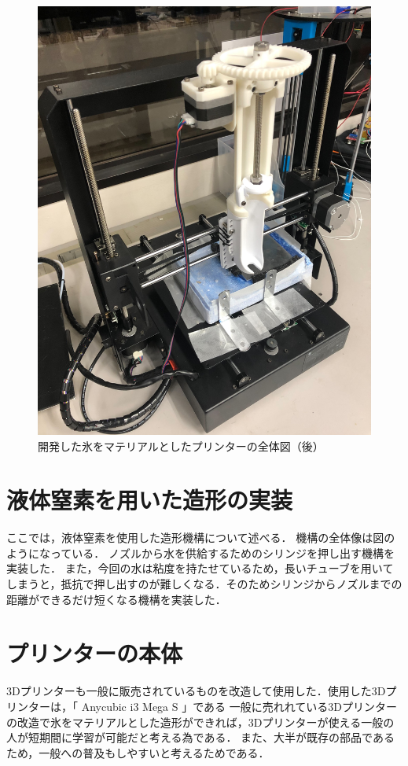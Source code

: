 \begin{figure}[H]
  \centering
  \includegraphics[width=7truecm]{./fig/printer2.jpg}
  \caption{開発した氷をマテリアルとしたプリンターの全体図（後）}
  \label{fig:printer2}
\end{figure}



\section{液体窒素を用いた造形の実装}
\label{sec:paragraph}
ここでは，液体窒素を使用した造形機構について述べる．
機構の全体像は図のようになっている．
ノズルから水を供給するためのシリンジを押し出す機構を実装した．
また，今回の水は粘度を持たせているため，長いチューブを用いてしまうと，抵抗で押し出すのが難しくなる．そのためシリンジからノズルまでの距離ができるだけ短くなる機構を実装した．

\section{プリンターの本体}
\label{sec:paragraph}
3Dプリンターも一般に販売されているものを改造して使用した．使用した3Dプリンターは，「 Anycubic i3 Mega S 」である
一般に売れれている3Dプリンターの改造で氷をマテリアルとした造形ができれば，3Dプリンターが使える一般の人が短期間に学習が可能だと考える為である．
また、大半が既存の部品であるため，一般への普及もしやすいと考えるためである．


